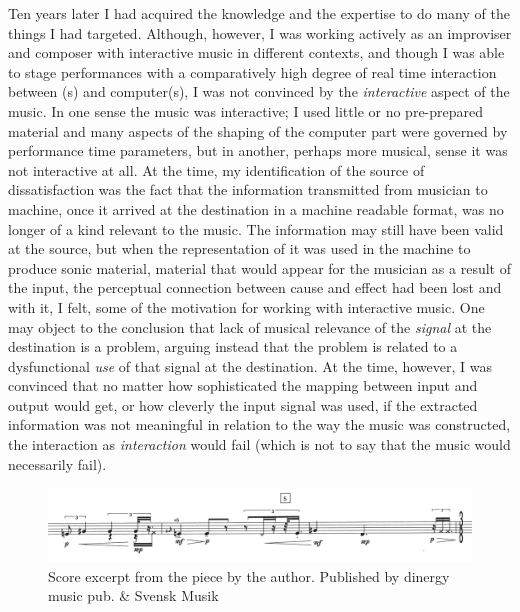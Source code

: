 Ten years later I had acquired the knowledge and the expertise to do many of the things I had targeted. Although, however, I was working actively as an improviser and composer with interactive music in different contexts, and though I was able to stage performances with a comparatively high degree of real time interaction between (s) and computer(s), I was not convinced by the \emph{interactive} aspect of the music. In one sense the music was interactive; I used little or no pre-prepared material and many aspects of the shaping of the computer part were governed by performance time parameters, but in another, perhaps more musical, sense it was not interactive at all. At the time, my identification of the source of dissatisfaction was the fact that the information transmitted from musician to machine, once it arrived at the destination in a machine readable format, was no longer of a kind relevant to the music. The information may still have been valid at the source, but when the representation of it was used in the machine to produce sonic material, material that would appear for the musician as a result of the input, the perceptual connection between cause and effect had been lost and with it, I felt, some of the motivation for working with interactive music. One may object to the conclusion that lack of musical relevance of the \emph{signal} at the destination is a problem, arguing instead that the problem is related to a dysfunctional \emph{use} of that signal at the destination. At the time, however, I was convinced that no matter how sophisticated the mapping between input and output would get, or how cleverly the input signal was used, if the extracted information was not meaningful in relation to the way the music was constructed, the interaction as \emph{interaction} would fail (which is not to say that the music would necessarily fail). 

\begin{figure}[ht]
  \centering
  \includegraphics[width=\textwidth]{img/goda-onda}
  \caption[Score excerpt from .]{Score excerpt from the piece  by the author. Published by dinergy music pub. \& Svensk Musik}
  \label{fig:goda-onda}
\end{figure}

